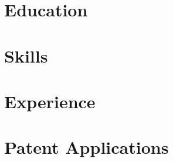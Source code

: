 \documentclass[letterpaper,11pt]{article}
\begin{document}


\section{Education}


\section{Skills}


\section{Experience}




\renewcommand\refname{Research}
\nocite{gardner_definition_2022}
\nocite{gardner_isods_2021}
\nocite{gardner_emg_2020}



\section{Patent Applications}

\end{document}
